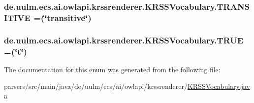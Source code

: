 \hypertarget{enumde_1_1uulm_1_1ecs_1_1ai_1_1owlapi_1_1krssrenderer_1_1_k_r_s_s_vocabulary_af8ce72482700d361f78b4e79f9ff47a2}{
\subsubsection[{T\-R\-A\-N\-S\-I\-T\-I\-V\-E}]{\setlength{\rightskip}{0pt plus 5cm}de.\-uulm.\-ecs.\-ai.\-owlapi.\-krssrenderer.\-K\-R\-S\-S\-Vocabulary.\-T\-R\-A\-N\-S\-I\-T\-I\-V\-E =(\char`\"{}transitive\char`\"{})}}\label{enumde_1_1uulm_1_1ecs_1_1ai_1_1owlapi_1_1krssrenderer_1_1_k_r_s_s_vocabulary_af8ce72482700d361f78b4e79f9ff47a2}
\hypertarget{enumde_1_1uulm_1_1ecs_1_1ai_1_1owlapi_1_1krssrenderer_1_1_k_r_s_s_vocabulary_a8090c3b638514b6309c5c174b9baeb8a}{
\subsubsection[{T\-R\-U\-E}]{\setlength{\rightskip}{0pt plus 5cm}de.\-uulm.\-ecs.\-ai.\-owlapi.\-krssrenderer.\-K\-R\-S\-S\-Vocabulary.\-T\-R\-U\-E =(\char`\"{}t\char`\"{})}}\label{enumde_1_1uulm_1_1ecs_1_1ai_1_1owlapi_1_1krssrenderer_1_1_k_r_s_s_vocabulary_a8090c3b638514b6309c5c174b9baeb8a}


The documentation for this enum was generated from the following file\-:\begin{DoxyCompactItemize}
\item 
parsers/src/main/java/de/uulm/ecs/ai/owlapi/krssrenderer/\hyperlink{_k_r_s_s_vocabulary_8java}{K\-R\-S\-S\-Vocabulary.\-java}\end{DoxyCompactItemize}
